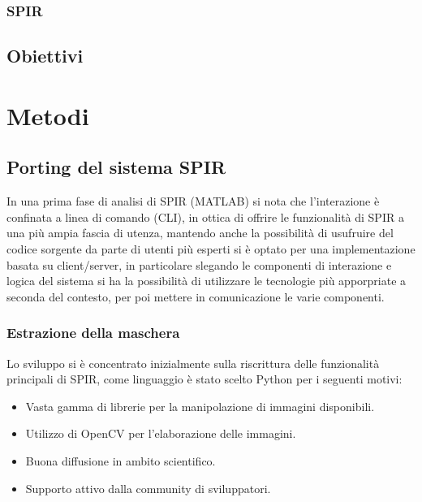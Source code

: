 \documentclass[a4paper,12pt]{report}
\begin{document}
    \subsection{SPIR}
  \section{Obiettivi}

\chapter{Metodi}
  \section{Porting del sistema SPIR}
    In una prima fase di analisi di SPIR (MATLAB) si nota che l'interazione è confinata
    a linea di comando (CLI), in ottica di offrire le funzionalità di SPIR a una più ampia
    fascia di utenza, mantendo anche la possibilità di usufruire del codice sorgente 
    da parte di utenti più esperti si è optato per una implementazione basata su client/server,
    in particolare slegando le componenti di interazione e logica del sistema si ha la possibilità
    di utilizzare le tecnologie più apporpriate a seconda del contesto, per poi mettere in comunicazione le 
    varie componenti.
    \subsection{Estrazione della maschera}
      Lo sviluppo si è concentrato inizialmente sulla riscrittura delle funzionalità principali di SPIR,
      come linguaggio è stato scelto Python per i seguenti motivi:
      \begin{itemize}
        \item Vasta gamma di librerie per la manipolazione di immagini disponibili.
        \item Utilizzo di OpenCV \cite{opencv_library} per l'elaborazione delle immagini.
        \item Buona diffusione in ambito scientifico.
        \item Supporto attivo dalla community di sviluppatori.
      \end{itemize}
      
\end{document}
